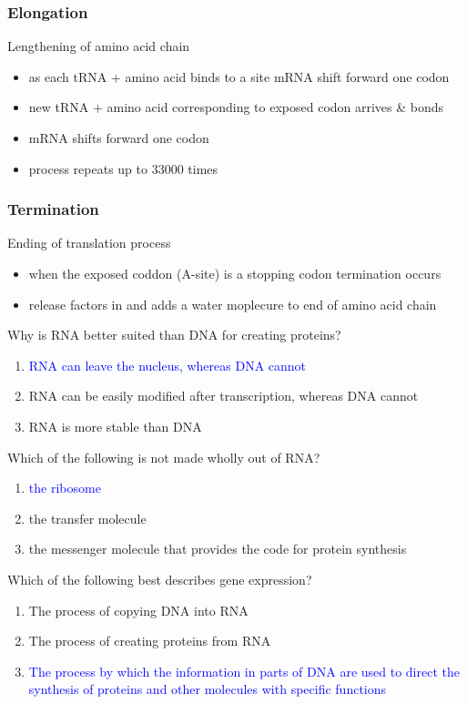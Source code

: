 \documentclass[11pt,fleqn]{book} %
\begin{document}
\subsubsection{Elongation}
Lengthening of amino acid chain
\begin{itemize}
    \item as each tRNA + amino acid binds to a site mRNA shift forward one codon
    \item new tRNA + amino acid corresponding to exposed codon arrives \& bonds
    \item mRNA shifts forward one codon
    \item process repeats up to 33000 times
\end{itemize}
\subsubsection{Termination}
Ending of translation process
\begin{itemize}
    \item when the exposed coddon (A-site) is a stopping codon termination occurs
    \item release factors in and adds a water moplecure to end of amino acid chain
\end{itemize}

\begin{exercise}
    Why is RNA better suited than DNA for creating proteins?
    \begin{enumerate}
        \item \textcolor{blue}{RNA can leave the nucleus, whereas DNA cannot}
        \item RNA can be easily modified after transcription, whereas DNA cannot
        \item RNA is more stable than DNA
    \end{enumerate}
\end{exercise}
\begin{exercise}
    Which of the following is not made wholly out of RNA?
    \begin{enumerate}
        \item \textcolor{blue}{the ribosome}
        \item the transfer molecule
        \item the messenger molecule that provides the code for protein synthesis
    \end{enumerate}
\end{exercise}
\begin{exercise}
    Which of the following best describes gene expression?
    \begin{enumerate}
        \item The process of copying DNA into RNA
        \item The process of creating proteins from RNA
        \item \textcolor{blue}{The process by which the information in parts of DNA are used to direct the synthesis of proteins and other molecules with specific functions}
    \end{enumerate}
\end{exercise}
\end{document}
